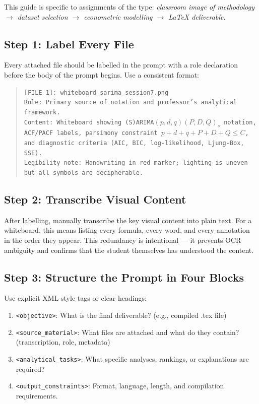 \documentclass[12pt,a4paper]{article}
\begin{document}
This guide is specific to assignments of the type: \textit{classroom image of
methodology $\to$ dataset selection $\to$ econometric modelling $\to$ LaTeX deliverable}.

\subsection{Step 1: Label Every File}

Every attached file should be labelled in the prompt with a role declaration
before the body of the prompt begins. Use a consistent format:

\begin{quote}
\texttt{[FILE 1]: whiteboard\_sarima\_session7.png}\\
\texttt{Role: Primary source of notation and professor's analytical framework.}\\
\texttt{Content: Whiteboard showing (S)ARIMA$(p,d,q)(P,D,Q)_s$ notation, ACF/PACF labels, parsimony constraint $p+d+q+P+D+Q\le C$, and diagnostic criteria (AIC, BIC, log-likelihood, Ljung-Box, SSE).}\\
\texttt{Legibility note: Handwriting in red marker; lighting is uneven but all symbols are decipherable.}
\end{quote}

\subsection{Step 2: Transcribe Visual Content}

After labelling, manually transcribe the key visual content into plain text.
For a whiteboard, this means listing every formula, every word, and every
annotation in the order they appear. This redundancy is intentional — it
prevents OCR ambiguity and confirms that the student themselves has understood
the content.

\subsection{Step 3: Structure the Prompt in Four Blocks}

Use explicit XML-style tags or clear headings:

\begin{enumerate}[noitemsep]
  \item \texttt{<objective>}: What is the final deliverable? (e.g., compiled .tex file)
  \item \texttt{<source\_material>}: What files are attached and what do they
  contain? (transcription, role, metadata)
  \item \texttt{<analytical\_tasks>}: What specific analyses, rankings, or
  explanations are required?
  \item \texttt{<output\_constraints>}: Format, language, length, and
  compilation requirements.
\end{enumerate}
\end{document}

